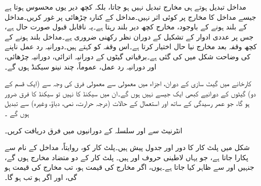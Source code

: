 مداخل تبدیل ہوتے ہی مخارج تبدیل نہیں ہو جاتا، بلکہ کچھ دیر یوں محسوس ہوتا ہے جیسے مداخل کا مخارج پر کوئی اثر نہیں۔مداخل کے کنارہ چڑھائی پر غور کریں۔مداخل کے بلند ہونے کے باوجود، مخارج کچھ دیر بلند رہتا ہے۔یہ ناقابل قبول صورت حال ہے، جس پر عددی ادوار کے تشکیل کے دوران نظر رکھنی ضروری ہے۔مداخل بلند ہونے کے کچھ وقفہ بعد مخارج نیا حال اختیار کرتا ہے۔اس وقفہ کو  کہتے ہیں۔دورانیہ رد عمل ناپنے کی وضاحت شکل میں کی گئی ہے۔برقیاتی گیٹوں کے دورانیہ اترائی، دورانیہ چڑھائی، اور دورانیہ رد عمل، عموماً، چند نینو سیکنڈ ہوں گے۔

کارخانے میں گیٹ سازی کے دوران، اجزاء میں معمولی سے معمولی فرق کی وجہ سے (ایک قسم کے دو) گیٹوں کے دورانیے کبھی ایک جیسے نہیں ہوں گے۔ان میں  سیکنڈ کا نہیں تو سیکنڈ کا فرق ضرور ہو گا، جو عمر رسیدگی کے ساتھ اور استعمال کے حالات (درجہ حرارت، نمی، دباؤ، وغیرہ) سے تبدیل ہوں گے ۔

انٹرنیٹ سے  اور  سلسلہ کے دورانیوں میں فرق دریافت کریں۔

شکل  میں  پلٹ کار کا دور اور جدول پیش ہیں۔پلٹ کار کو، روایتاً، مداخل کے نام سے پکارا جاتا ہے، جو یہاں لاطینی حروف   اور  ہیں۔ پلٹ کار کے دو متضاد مخارج ہوں گے، جنہیں  اور  سے ظاہر کیا جاتا ہے۔یوں، اگر مخارج  کی قیمت  ہو، تب مخارج  کی قیمت  ہو گی، اور اگر  ہو تب  ہو گا۔



